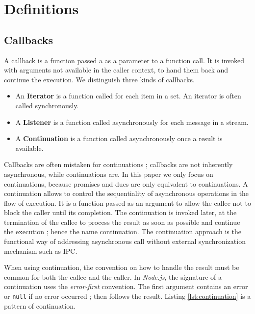 \section{Definitions} \label{section:definitions}

\subsection{Callbacks} \label{section:definitions:continuation}

A callback is a function passed a as a parameter to a function call.
It is invoked with arguments not available in the caller context, to hand them back and continue the execution.
We distinguish three kinds of callbacks.

\begin{itemize}
  \item An \textbf{Iterator} is a function called for each item in a set. An iterator is often called synchronously.
  \item A \textbf{Listener} is a function called asynchronously for each message in a stream.
  \item A \textbf{Continuation} is a function called asynchronously once a result is available.
\end{itemize}

Callbacks are often mistaken for continuations ; callbacks are not inherently asynchronous, while continuations are.
In this paper we only focus on continuations, because promises and dues are only equivalent to continuations.
A continuation allows to control the sequentiality of asynchronous operations in the flow of execution.
It is a function passed as an argument to allow the callee not to block the caller until its completion.
The continuation is invoked later, at the termination of the callee to process the result as soon as possible and continue the execution ; hence the name continuation.
The continuation approach is the functional way of addressing asynchronous call without external synchronization mechanism such as IPC.

When using continuation, the convention on how to handle the result must be common for both the callee and the caller.
In \textit{Node.js}, the signature of a continuation uses the \textit{error-first} convention.
The first argument contains an error or \texttt{null} if no error occurred ; then follows the result.
Listing \ref{lst:continuation} is a pattern of continuation.


